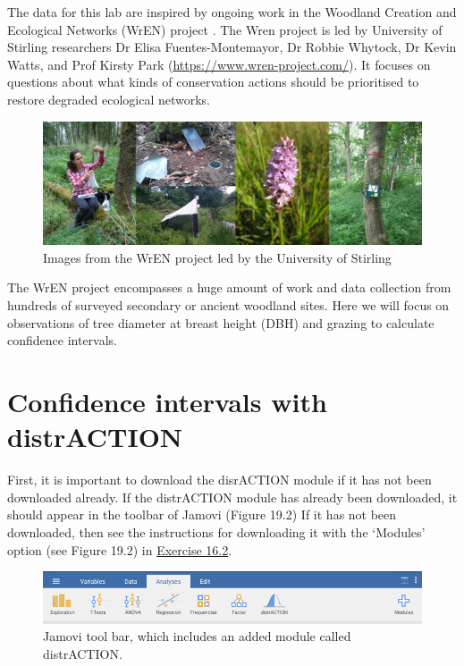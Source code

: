 \documentclass[
]{scrbook}
\begin{document}
The data for this lab are inspired by ongoing work in the Woodland Creation and Ecological Networks (WrEN) project \citep{Fuentes-Montemayor2022, Fuentes-Montemayor2022a}.
The Wren project is led by University of Stirling researchers Dr Elisa Fuentes-Montemayor, Dr Robbie Whytock, Dr Kevin Watts, and Prof Kirsty Park (\url{https://www.wren-project.com/}).
It focuses on questions about what kinds of conservation actions should be prioritised to restore degraded ecological networks.

\begin{figure}
\includegraphics[width=1\linewidth]{img/wren_project} \caption{Images from the WrEN project led by the University of Stirling}\label{fig:unnamed-chunk-86}
\end{figure}

The WrEN project encompasses a huge amount of work and data collection from hundreds of surveyed secondary or ancient woodland sites.
Here we will focus on observations of tree diameter at breast height (DBH) and grazing to calculate confidence intervals.

\hypertarget{confidence-intervals-with-distraction}{%
\section{Confidence intervals with distrACTION}\label{confidence-intervals-with-distraction}}

First, it is important to download the disrACTION module if it has not been downloaded already.
If the distrACTION module has already been downloaded, it should appear in the toolbar of Jamovi (Figure 19.2)
If it has not been downloaded, then see the instructions for downloading it with the `Modules' option (see Figure 19.2) in \href{https://bradduthie.github.io/SCIU4T4/Chapter_16.html\#probabilities-from-a-normal-distribution}{Exercise 16.2}.

\begin{figure}
\includegraphics[width=1\linewidth]{img/jamovi_toolbar_modules_distrACTION} \caption{Jamovi tool bar, which includes an added module called distrACTION.}\label{fig:unnamed-chunk-87}
\end{figure}
\end{document}
